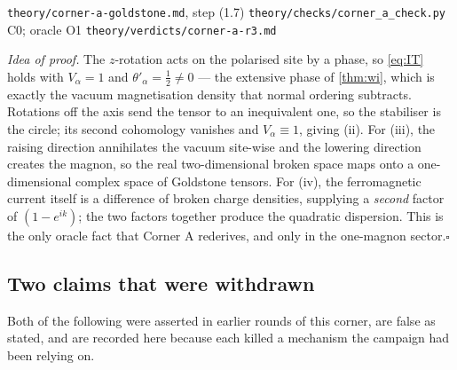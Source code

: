 %
{\texttt{theory/corner-a-goldstone.md}, step (1.7)}%
{\texttt{theory/checks/corner\_a\_check.py} C0; oracle O1}%
{\texttt{theory/verdicts/corner-a-r3.md}}

\smallskip\noindent\textit{Idea of proof.}
The $z$-rotation acts on the polarised site by a phase, so \cref{eq:IT} holds with
$V_\alpha=1$ and $\theta'_\alpha=\tfrac12\neq0$ --- the extensive phase of
\cref{thm:wi}, which is exactly the vacuum magnetisation density that normal
ordering subtracts.  Rotations off the axis send the tensor to an inequivalent
one, so the stabiliser is the circle; its second cohomology vanishes and
$V_\alpha\equiv1$, giving (ii).  For (iii), the raising direction annihilates the
vacuum site-wise and the lowering direction creates the magnon, so the real
two-dimensional broken space maps onto a one-dimensional complex space of
Goldstone tensors.  For (iv), the ferromagnetic current itself is a difference of
broken charge densities, supplying a \emph{second} factor of $(1-e^{ik})$; the two
factors together produce the quadratic dispersion.  This is the only oracle fact
that Corner A rederives, and only in the one-magnon sector.\hfill$\square$

\subsection{Two claims that were withdrawn}

Both of the following were asserted in earlier rounds of this corner, are false
as stated, and are recorded here because each killed a mechanism the campaign had
been relying on.

